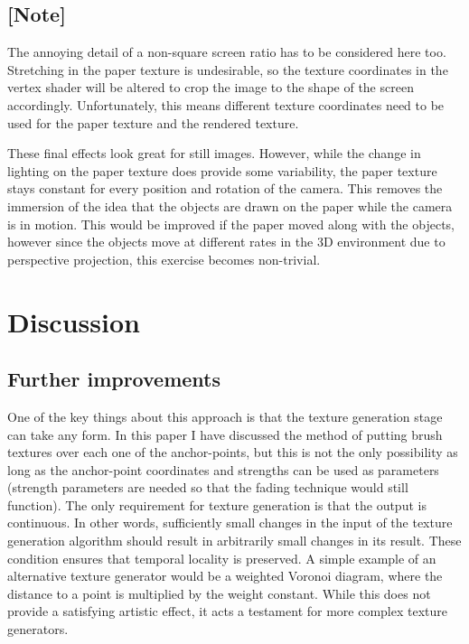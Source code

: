 \documentclass[a4paper, 12pt]{article}
\begin{document}
\subsection{[Note]}
The annoying detail of a non-square screen ratio has to be considered here too. Stretching in the paper texture is undesirable, so the texture coordinates in the vertex shader will be altered to crop the image to the shape of the screen accordingly. Unfortunately, this means different texture coordinates need to be used for the paper texture and the rendered texture.

These final effects look great for still images. However, while the change in lighting on the paper texture does provide some variability, the paper texture stays constant for every position and rotation of the camera. This removes the immersion of the idea that the objects are drawn on the paper while the camera is in motion. This would be improved if the paper moved along with the objects, however since the objects move at different rates in the 3D environment due to perspective projection, this exercise becomes non-trivial.



\section{Discussion}

\subsection{Further improvements}
One of the key things about this approach is that the texture generation stage can take any form. In this paper I have discussed the method of putting brush textures over each one of the anchor-points, but this is not the only possibility as long as the anchor-point coordinates and strengths can be used as parameters (strength parameters are needed so that the fading technique would still function). The only requirement for texture generation is that the output is continuous. In other words, sufficiently small changes in the input of the texture generation algorithm should result in arbitrarily small changes in its result. These condition ensures that temporal locality is preserved. A simple example of an alternative texture generator would be a weighted Voronoi diagram, where the distance to a point is multiplied by the weight constant. While this does not provide a satisfying artistic effect, it acts a testament for more complex texture generators.
\end{document}
